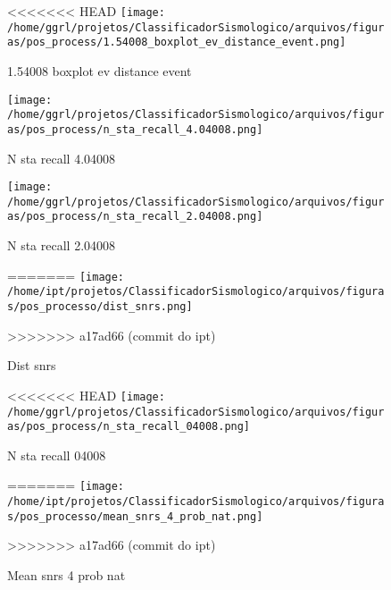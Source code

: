 
                    \begin{figure}[H]
                        \centering
<<<<<<< HEAD
                        \texttt{[image: /home/ggrl/projetos/ClassificadorSismologico/arquivos/figuras/pos\_process/1.54008\_boxplot\_ev\_distance\_event.png]}
                        \caption{1.54008 boxplot ev distance event}
                        \label{fig:1.54008_boxplot_ev_distance_event}
                    \end{figure}
                

                    \begin{figure}[H]
                        \centering
                        \texttt{[image: /home/ggrl/projetos/ClassificadorSismologico/arquivos/figuras/pos\_process/n\_sta\_recall\_4.04008.png]}
                        \caption{N sta recall 4.04008}
                        \label{fig:n_sta_recall_4.04008}
                    \end{figure}
                

                    \begin{figure}[H]
                        \centering
                        \texttt{[image: /home/ggrl/projetos/ClassificadorSismologico/arquivos/figuras/pos\_process/n\_sta\_recall\_2.04008.png]}
                        \caption{N sta recall 2.04008}
                        \label{fig:n_sta_recall_2.04008}
=======
                        \texttt{[image: /home/ipt/projetos/ClassificadorSismologico/arquivos/figuras/pos\_processo/dist\_snrs.png]}
                        \caption{Dist snrs}
                        \label{fig:dist_snrs}
>>>>>>> a17ad66 (commit do ipt)
                    \end{figure}
                

                    \begin{figure}[H]
                        \centering
<<<<<<< HEAD
                        \texttt{[image: /home/ggrl/projetos/ClassificadorSismologico/arquivos/figuras/pos\_process/n\_sta\_recall\_04008.png]}
                        \caption{N sta recall 04008}
                        \label{fig:n_sta_recall_04008}
=======
                        \texttt{[image: /home/ipt/projetos/ClassificadorSismologico/arquivos/figuras/pos\_processo/mean\_snrs\_4\_prob\_nat.png]}
                        \caption{Mean snrs 4 prob nat}
                        \label{fig:mean_snrs_4_prob_nat}
>>>>>>> a17ad66 (commit do ipt)
                    \end{figure}
                

